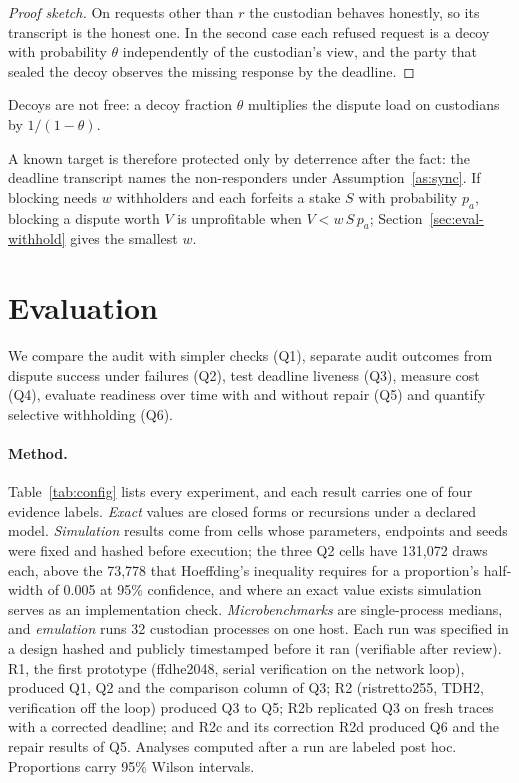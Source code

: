 \documentclass[Crown,sagev]{sagej}
\theoremstyle{plain}
\theoremstyle{definition}
\theoremstyle{remark}
\begin{document}
\begin{proof}[Proof sketch]
On requests other than $r$ the custodian behaves honestly, so its transcript is the honest one. In the second case each refused request is a decoy with probability $\theta$ independently of the custodian's view, and the party that sealed the decoy observes the missing response by the deadline.
\end{proof}

Decoys are not free: a decoy fraction $\theta$ multiplies the dispute load on custodians by $1/(1-\theta)$.

A known target is therefore protected only by deterrence after the fact: the deadline transcript names the non-responders under Assumption~\ref{as:sync}. If blocking needs $w$ withholders and each forfeits a stake $S$ with probability $p_a$, blocking a dispute worth $V$ is unprofitable when $V<w\,S\,p_a$; Section~\ref{sec:eval-withhold} gives the smallest $w$.

\section{Evaluation}\label{sec:evaluation}

We compare the audit with simpler checks (Q1), separate audit outcomes from dispute success under failures (Q2), test deadline liveness (Q3), measure cost (Q4), evaluate readiness over time with and without repair (Q5) and quantify selective withholding (Q6).

\paragraph{Method.} Table~\ref{tab:config} lists every experiment, and each result carries one of four evidence labels. \emph{Exact} values are closed forms or recursions under a declared model. \emph{Simulation} results come from cells whose parameters, endpoints and seeds were fixed and hashed before execution; the three Q2 cells have 131{,}072 draws each, above the 73{,}778 that Hoeffding's inequality requires for a proportion's half-width of 0.005 at 95\% confidence\cite{hoeffding1963}, and where an exact value exists simulation serves as an implementation check. \emph{Microbenchmarks} are single-process medians, and \emph{emulation} runs 32 custodian processes on one host. Each run was specified in a design hashed and publicly timestamped before it ran (verifiable after review). R1, the first prototype (ffdhe2048, serial verification on the network loop), produced Q1, Q2 and the comparison column of Q3; R2 (ristretto255, TDH2, verification off the loop) produced Q3 to Q5; R2b replicated Q3 on fresh traces with a corrected deadline; and R2c and its correction R2d produced Q6 and the repair results of Q5. Analyses computed after a run are labeled post hoc. Proportions carry 95\% Wilson intervals\cite{wilson1927}.
\end{document}
